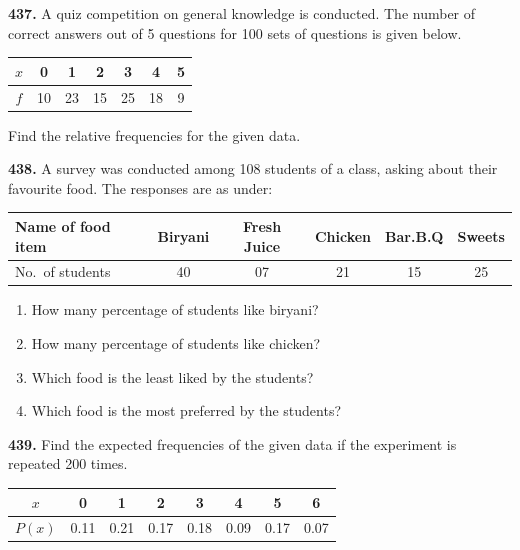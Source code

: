 \documentclass[11pt]{article}
\begin{document}
\bigskip
\noindent\textbf{437.} A quiz competition on general knowledge is conducted. The number of correct answers out of 5 questions for 100 sets of questions is given below.

\begin{center}
\begin{tabular}{|c|c|c|c|c|c|c|}
\hline
$x$ & 0 & 1 & 2 & 3 & 4 & 5 \\
\hline
$f$ & 10 & 23 & 15 & 25 & 18 & 9 \\
\hline
\end{tabular}
\end{center}

Find the relative frequencies for the given data.

\bigskip
\noindent\textbf{438.} A survey was conducted among 108 students of a class, asking about their favourite food. The responses are as under:

\begin{center}
\begin{tabular}{|l|c|c|c|c|c|}
\hline
Name of food item & Biryani & Fresh Juice & Chicken & Bar.B.Q & Sweets \\
\hline
No.\ of students & 40 & 07 & 21 & 15 & 25 \\
\hline
\end{tabular}
\end{center}

\begin{enumerate}[label=(\roman*)]
\item How many percentage of students like biryani?
\item How many percentage of students like chicken?
\item Which food is the least liked by the students?
\item Which food is the most preferred by the students?
\end{enumerate}

\bigskip
\noindent\textbf{439.} Find the expected frequencies of the given data if the experiment is repeated 200 times.

\begin{center}
\begin{tabular}{|c|c|c|c|c|c|c|c|}
\hline
$x$ & 0 & 1 & 2 & 3 & 4 & 5 & 6 \\
\hline
$P(x)$ & 0.11 & 0.21 & 0.17 & 0.18 & 0.09 & 0.17 & 0.07 \\
\hline
\end{tabular}
\end{center}
\end{document}

